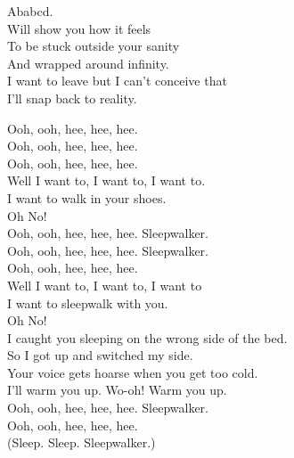 



Ababcd. \\
Will show you how it feels \\
To be stuck outside your sanity \\
And wrapped around infinity. \\
I want to leave but I can't conceive that \\
I'll snap back to reality. \\





Ooh, ooh, hee, hee, hee. \\
Ooh, ooh, hee, hee, hee. \\
Ooh, ooh, hee, hee, hee. \\
Well I want to, I want to, I want to. \\
I want to walk in your shoes. \\
Oh No! \\

Ooh, ooh, hee, hee, hee. Sleepwalker. \\
Ooh, ooh, hee, hee, hee. Sleepwalker. \\
Ooh, ooh, hee, hee, hee. \\
Well I want to, I want to, I want to \\
I want to sleepwalk with you. \\
Oh No! \\

I caught you sleeping on the wrong side of the bed. \\
So I got up and switched my side. \\
Your voice gets hoarse when you get too cold. \\
I'll warm you up. Wo-oh! Warm you up. \\
Ooh, ooh, hee, hee, hee. Sleepwalker. \\
Ooh, ooh, hee, hee, hee. \\
(Sleep. Sleep. Sleepwalker.) \\

